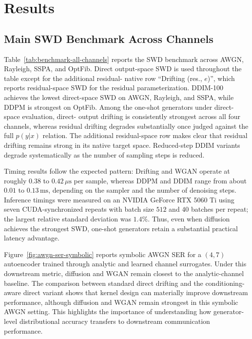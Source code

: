 \documentclass[conference]{IEEEtran}
\begin{document}
\section{Results}
\subsection{Main SWD Benchmark Across Channels}
Table~\ref{tab:benchmark-all-channels} reports the SWD benchmark across AWGN, Rayleigh, SSPA, and
OptFib. Direct output-space SWD is used throughout the table except for the additional residual-
native row ``Drifting (res., \(e\))'', which reports residual-space SWD for the residual
parameterization. DDIM-100 achieves the lowest direct-space SWD on AWGN, Rayleigh, and SSPA, while
DDPM is strongest on OptFib. Among the one-shot generators under direct-space evaluation, direct-
output drifting is consistently strongest across all four channels, whereas residual drifting
degrades substantially once judged against the full \(p(y | x)\) relation. The additional
residual-space row makes clear that residual drifting remains strong in its native target space.
Reduced-step DDIM variants degrade systematically as the number of sampling steps is reduced.

Timing results follow the expected pattern: Drifting and WGAN operate at roughly \(0.38\) to
\(0.42\,\mu\mathrm{s}\) per sample, whereas DDPM and DDIM range from about \(0.01\) to \(0.13\,
\mathrm{ms}\), depending on the sampler and the number of denoising steps. Inference timings were
measured on an NVIDIA GeForce RTX 5060 Ti using seven CUDA-synchronized repeats with batch size
\(512\) and \(40\) batches per repeat; the largest relative standard deviation was \(1.4\%\). Thus,
even when diffusion achieves the strongest SWD, one-shot generators retain a substantial practical
latency advantage.



Figure~\ref{fig:awgn-ser-symbolic} reports symbolic AWGN SER for a \((4,7)\) autoencoder trained through analytic and learned channel surrogates. Under this downstream metric, diffusion and WGAN remain closest to the analytic-channel baseline. The comparison between standard direct drifting and the conditioning-aware direct variant shows that kernel design can materially improve downstream performance, although diffusion and WGAN remain strongest in this symbolic AWGN setting.
This highlights the importance of understanding how generator-level distributional accuracy transfers to downstream communication performance.
\end{document}
